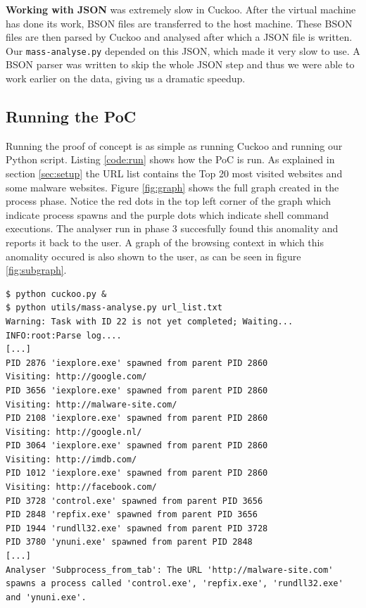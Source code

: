 \textbf{Working with JSON} was extremely slow in Cuckoo. After the virtual machine has done its work, BSON files are transferred to the host machine. These BSON files are then parsed by Cuckoo and analysed after which a JSON file is written. Our \texttt{mass-analyse.py} depended on this JSON, which made it very slow to use. A BSON parser was written to skip the whole JSON step and thus we were able to work earlier on the data, giving us a dramatic speedup.

\subsection{Running the PoC}

Running the proof of concept is as simple as running Cuckoo and running our Python script. Listing \ref{code:run} shows how the PoC is run. As explained in section \ref{sec:setup} the URL list contains the Top 20 most visited websites and some malware websites. Figure \ref{fig:graph} shows the full graph created in the process phase. Notice the red dots in the top left corner of the graph which indicate process spawns and the purple dots which indicate shell command executions. The analyser run in phase 3 succesfully found this anomality and reports it back to the user. A graph of the browsing context in which this anomality occured is also shown to the user, as can be seen in figure \ref{fig:subgraph}.

\begin{lstlisting}[caption={Mass analyser being run},label={code:run}]
$ python cuckoo.py &
$ python utils/mass-analyse.py url_list.txt
Warning: Task with ID 22 is not yet completed; Waiting...
INFO:root:Parse log....
[...]
PID 2876 'iexplore.exe' spawned from parent PID 2860
Visiting: http://google.com/
PID 3656 'iexplore.exe' spawned from parent PID 2860
Visiting: http://malware-site.com/
PID 2108 'iexplore.exe' spawned from parent PID 2860
Visiting: http://google.nl/
PID 3064 'iexplore.exe' spawned from parent PID 2860
Visiting: http://imdb.com/
PID 1012 'iexplore.exe' spawned from parent PID 2860
Visiting: http://facebook.com/
PID 3728 'control.exe' spawned from parent PID 3656
PID 2848 'repfix.exe' spawned from parent PID 3656
PID 1944 'rundll32.exe' spawned from parent PID 3728
PID 3780 'ynuni.exe' spawned from parent PID 2848
[...]
Analyser 'Subprocess_from_tab': The URL 'http://malware-site.com' spawns a process called 'control.exe', 'repfix.exe', 'rundll32.exe' and 'ynuni.exe'.
\end{lstlisting}

